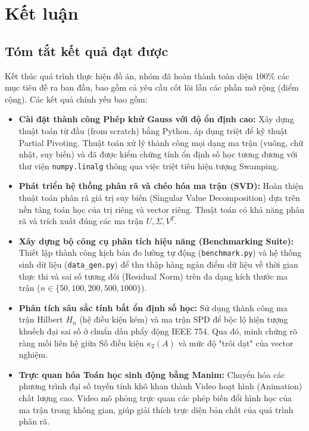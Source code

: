 \section{Kết luận}

\subsection{Tóm tắt kết quả đạt được}
Kết thúc quá trình thực hiện đồ án, nhóm đã hoàn thành toàn diện 100\% các mục tiêu đề ra ban đầu, bao gồm cả yêu cầu cốt lõi lẫn các phần mở rộng (điểm cộng). Các kết quả chính yếu bao gồm:

\begin{itemize}[itemsep=0.15cm, topsep=0.1cm]
    \item \textbf{Cài đặt thành công Phép khử Gauss với độ ổn định cao:} Xây dựng thuật toán từ đầu (from scratch) bằng Python, áp dụng triệt để kỹ thuật Partial Pivoting. Thuật toán xử lý thành công mọi dạng ma trận (vuông, chữ nhật, suy biến) và đã được kiểm chứng tính ổn định số học tương đương với thư viện \texttt{numpy.linalg} thông qua việc triệt tiêu hiện tượng Swamping.
    
    \item \textbf{Phát triển hệ thống phân rã và chéo hóa ma trận (SVD):} Hoàn thiện thuật toán phân rã giá trị suy biến (Singular Value Decomposition) dựa trên nền tảng toán học của trị riêng và vector riêng. Thuật toán có khả năng phân rã và trích xuất đúng các ma trận $U, \Sigma, V^T$.
    
    \item \textbf{Xây dựng bộ công cụ phân tích hiệu năng (Benchmarking Suite):} Thiết lập thành công kịch bản đo lường tự động (\texttt{benchmark.py}) và hệ thống sinh dữ liệu (\texttt{data\_gen.py}) để thu thập hàng ngàn điểm dữ liệu về thời gian thực thi và sai số tương đối (Residual Norm) trên đa dạng kích thước ma trận ($n \in \{50, 100, 200, 500, 1000\}$).
    
    \item \textbf{Phân tích sâu sắc tính bất ổn định số học:} Sử dụng thành công ma trận Hilbert $H_n$ (hệ điều kiện kém) và ma trận SPD để bộc lộ hiện tượng khuếch đại sai số ở chuẩn dấu phẩy động IEEE 754. Qua đó, minh chứng rõ ràng mối liên hệ giữa Số điều kiện $\kappa_2(A)$ và mức độ "trôi dạt" của vector nghiệm.
    
    \item \textbf{Trực quan hóa Toán học sinh động bằng Manim:} Chuyển hóa các phương trình đại số tuyến tính khô khan thành Video hoạt hình (Animation) chất lượng cao. Video mô phỏng trực quan các phép biến đổi hình học của ma trận trong không gian, giúp giải thích trực diện bản chất của quá trình phân rã.
    

\end{itemize}
